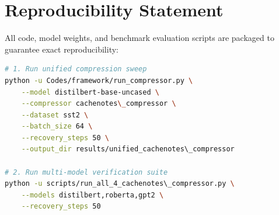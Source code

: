 \section{Reproducibility Statement}
All code, model weights, and benchmark evaluation scripts are packaged to guarantee exact reproducibility:
\begin{lstlisting}[language=bash]
# 1. Run unified compression sweep
python -u Codes/framework/run_compressor.py \
    --model distilbert-base-uncased \
    --compressor cachenotes\_compressor \
    --dataset sst2 \
    --batch_size 64 \
    --recovery_steps 50 \
    --output_dir results/unified_cachenotes\_compressor

# 2. Run multi-model verification suite
python -u scripts/run_all_4_cachenotes\_compressor.py \
    --models distilbert,roberta,gpt2 \
    --recovery_steps 50
\end{lstlisting}
